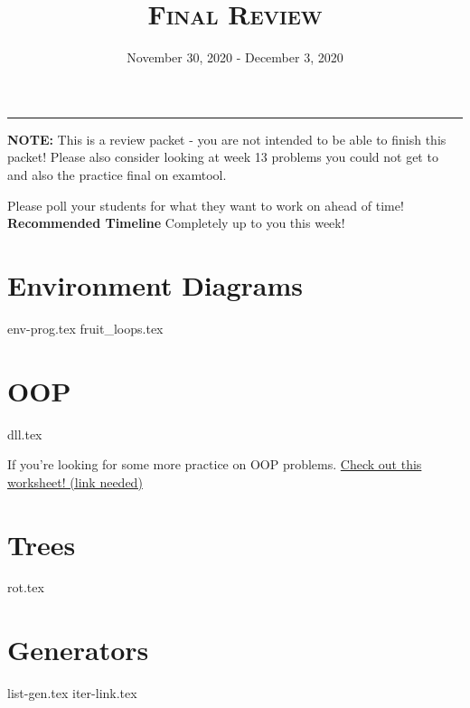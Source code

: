 \documentclass{exam}
\title{\textsc{Final Review}}
\date{November 30, 2020 - December 3, 2020}
\begin{document}
\maketitle\rule{\textwidth}{0.15em}
\fontsize{12}{15}\selectfont

\begin{blocksection}
\begin{guide}
\textbf{NOTE:} This is a review packet - you are not intended to be able to finish this packet! Please also consider looking at week 13 problems you could not get to and also the practice final on examtool.

Please poll your students for what they want to work on ahead of time!
\textbf{Recommended Timeline}
Completely up to you this week!
\end{guide}
\end{blocksection}
\section{Environment Diagrams}
\begin{questions}
{env-prog.tex}
{fruit_loops.tex}
\end{questions}
\newpage

\section{OOP}
\begin{questions}
{dll.tex}
\end{questions}
\vspace{1\baselineskip}
If you're looking for some more practice on OOP problems. \href{INSERT OOP LINK HERE}{Check out this worksheet! (link needed)}
\newpage

\section{Trees}
\begin{questions}
{rot.tex}
\end{questions}

\section{Generators}
\begin{questions}
{list-gen.tex}
{iter-link.tex}
\end{questions}
\end{document}
